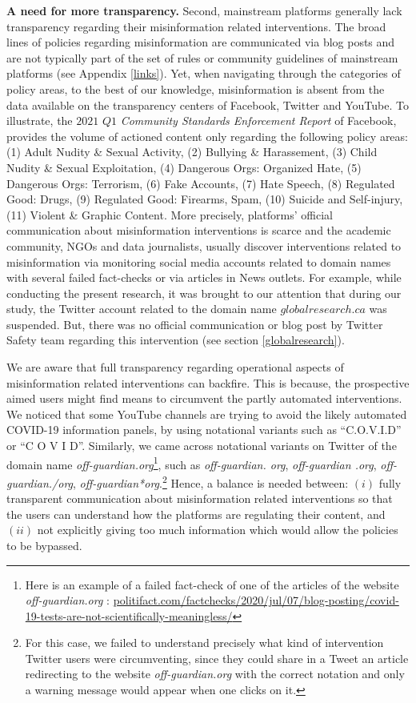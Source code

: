 \documentclass{article}
\begin{document}
{\bf A need for more transparency.} Second, mainstream platforms generally lack transparency regarding their misinformation related interventions.  The broad lines of policies regarding misinformation are communicated via blog posts and are not typically part of the set of rules or community guidelines of mainstream platforms (see Appendix \ref{links}). Yet, when navigating through the categories of policy areas, to the best of our knowledge, misinformation is absent from the data available on the transparency centers of Facebook, Twitter and YouTube. To illustrate, the $2021$ $Q1$ {\it Community Standards Enforcement Report} of Facebook, provides the volume of actioned content only regarding the following policy areas: (1) Adult Nudity \& Sexual Activity, (2) Bullying \& Harassement, (3) Child Nudity \& Sexual Exploitation, (4) Dangerous Orgs: Organized Hate, (5) Dangerous Orgs: Terrorism, (6) Fake Accounts, (7) Hate Speech, (8) Regulated Good: Drugs, (9) Regulated Good: Firearms, Spam, (10) Suicide and Self-injury, (11) Violent \& Graphic Content. More precisely, platforms' official communication about misinformation interventions is scarce and the academic community, NGOs and data journalists, usually discover interventions related to misinformation via monitoring social media accounts related to domain names with several failed fact-checks or via articles in News outlets. For example, while conducting the present research, it was brought to our attention that during our study, the Twitter account related to the domain name $globalresearch.ca$ was suspended. But, there was no official communication or blog post by Twitter Safety team regarding this intervention (see section \ref{globalresearch}). 

We are aware that full transparency regarding operational aspects of misinformation related interventions can backfire. This is because, the prospective aimed users might find means to circumvent the partly automated interventions. We noticed that some YouTube channels are trying to avoid the likely automated COVID-19 information panels, by using notational variants such as ``C.O.V.I.D'' or ``C O V I D''. Similarly, we came across notational variants on Twitter of the domain name {\it off-guardian.org}\footnote{Here is an example of a failed fact-check of one of the articles of the website {\it off-guardian.org} : \href{https://www.politifact.com/factchecks/2020/jul/07/blog-posting/covid-19-tests-are-not-scientifically-meaningless/}{politifact.com/factchecks/2020/jul/07/blog-posting/covid-19-tests-are-not-scientifically-meaningless/}}, such as {\it off-guardian. org}, {\it off-guardian .org}, {\it off-guardian./org}, {\it off-guardian*org}.\footnote{For this case, we failed to understand precisely what kind of intervention Twitter users were circumventing, since they could share in a Tweet an article redirecting to the website {\it off-guardian.org} with the correct notation and only a warning message would appear when one clicks on it.} Hence, a balance is needed between: $(i)$ fully transparent communication about misinformation related interventions so that the users can understand how the platforms are regulating their content, and $(ii)$ not explicitly giving too much information which would allow the policies to be bypassed.
\end{document}

